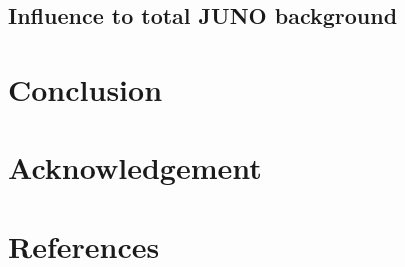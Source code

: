 \documentclass[review,number,sort&compress]{elsarticle}
\begin{document}
\subsection{Influence to total JUNO background}

\section{Conclusion}

\section{Acknowledgement}
\section*{References}

\end{document}
